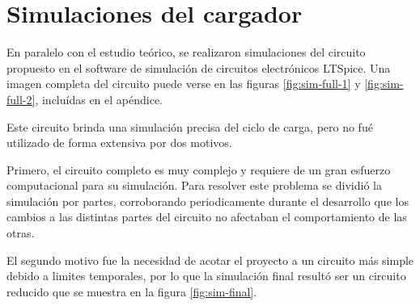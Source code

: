 \section{Simulaciones del cargador}

En paralelo con el estudio teórico, se realizaron simulaciones del circuito propuesto en el software de simulación de circuitos electrónicos LTSpice.
Una imagen completa del circuito puede verse en las figuras \ref{fig:sim-full-1} y \ref{fig:sim-full-2}, incluídas en el apéndice.

Este circuito brinda una simulación precisa del ciclo de carga, pero no fué utilizado de forma extensiva por dos motivos.

Primero, el circuito completo es muy complejo y requiere de un gran esfuerzo computacional para su simulación.
Para resolver este problema se dividió la simulación por partes,
corroborando periodicamente durante el desarrollo que los cambios a las distintas partes del circuito no afectaban el comportamiento de las otras.

El segundo motivo fue la necesidad de acotar el proyecto a un circuito más simple debido a limites temporales,
por lo que la simulación final resultó ser un circuito reducido que se muestra en la figura \ref{fig:sim-final}.
